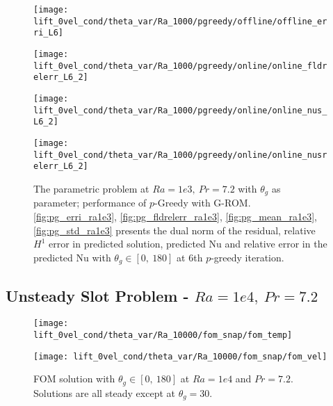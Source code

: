 \begin{figure}[h!]
    \begin{minipage}[b]{.25\linewidth}
        \centering \texttt{[image: lift\_0vel\_cond/theta\_var/Ra\_1000/pgreedy/offline/offline\_erri\_L6]}
        \label{fig:pg_erri_ra1e3}
    \end{minipage}%
    \begin{minipage}[b]{.25\linewidth}
        \centering \texttt{[image: lift\_0vel\_cond/theta\_var/Ra\_1000/pgreedy/online/online\_fldrelerr\_L6\_2]}
        \label{fig:pg_fldrelerr_ra1e3}
    \end{minipage}
    \begin{minipage}[b]{.25\linewidth}
        \centering \texttt{[image: lift\_0vel\_cond/theta\_var/Ra\_1000/pgreedy/online/online\_nus\_L6\_2]}
        \label{fig:pg_mean_ra1e3}
    \end{minipage}%
    \begin{minipage}[b]{.25\linewidth}
        \centering \texttt{[image: lift\_0vel\_cond/theta\_var/Ra\_1000/pgreedy/online/online\_nusrelerr\_L6\_2]}
        \label{fig:pg_std_ra1e3}
    \end{minipage} \caption{The parametric problem at $Ra=1e3,~Pr=7.2$ with $\theta_g$ as
    parameter; performance of $p$-Greedy with G-ROM.
    \ref{fig:pg_erri_ra1e3}, \ref{fig:pg_fldrelerr_ra1e3},
    \ref{fig:pg_mean_ra1e3}, \ref{fig:pg_std_ra1e3} presents the dual norm of the
    residual, relative $H^1$ error in predicted solution, predicted Nu and
    relative error in the predicted Nu with $\theta_g \in [0,~180]$ at 6th
    $p$-greedy iteration.}
    \label{fig:pg_online_ra1e3} 
\end{figure}
\clearpage
\subsection{Unsteady Slot Problem - $Ra=1e4,~Pr=7.2$}
\begin{figure}[h!]
    \begin{minipage}[b]{.5\linewidth}
   \centering 
   \texttt{[image: lift\_0vel\_cond/theta\_var/Ra\_10000/fom\_snap/fom\_temp]}
    \end{minipage}%
    \begin{minipage}[b]{.5\linewidth}
   \centering 
   \texttt{[image: lift\_0vel\_cond/theta\_var/Ra\_10000/fom\_snap/fom\_vel]}
    \end{minipage} \caption{FOM solution with $\theta_g \in [0,~180]$ at
    $Ra=1e4$ and $Pr=7.2$. Solutions are all steady except at $\theta_g=30$.}
\label{fig:slot_pr_7.2_fom_sol} \end{figure}
